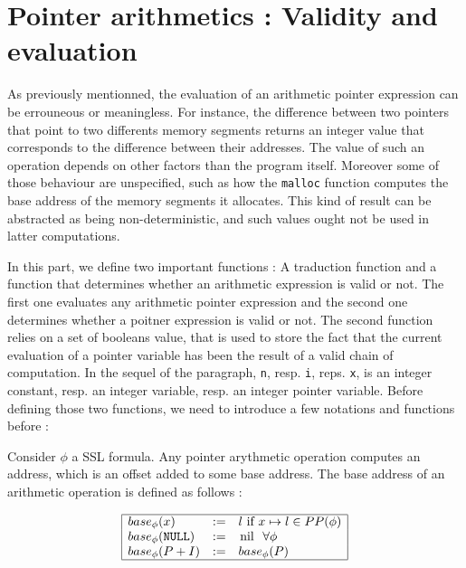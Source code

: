 \section{Pointer arithmetics : Validity and evaluation}

As previously mentionned, the evaluation of an arithmetic pointer
expression can be errouneous or meaningless. For instance, the difference
between two pointers that point to two differents memory segments returns an
integer value that corresponds to the difference between their addresses. The value of such an operation depends on other factors than the program itself. Moreover some of those behaviour are unspecified, such as how the \lstinline{malloc} function computes the base address of the memory segments it allocates. 
This kind of result can be abstracted  as being non-deterministic, and such 
values ought not be used in latter computations.

In this part, we define two important functions : A traduction function and a function that determines whether an arithmetic expression is valid or not.  
The first one evaluates any
arithmetic pointer expression and the second one determines whether
a poitner expression is valid or not.
The second function relies on a set of booleans value, that is used
to store the fact that the current evaluation of a pointer variable
has been the result of a valid chain of computation.
In the sequel of the paragraph, \lstinline!n!, resp. \lstinline!i!, reps. \lstinline!x!, is an integer constant, resp. an integer variable, resp. an integer
pointer variable.
Before defining those two functions, we need to introduce a few notations and
functions before :

Consider $\phi$ a SSL formula. Any pointer arythmetic operation computes
an address, which is an offset added to some base address. The base
address of an arithmetic operation is defined as follows :

$$
\begin{array}{|lll|}
\hline
\base{\phi}{x}&:=& l \mbox{ if }  \Pointsto{x}{l} \in \Pp{\phi} \\
\base{\phi}{\NULL} &:=& \nil \gspace \forall \phi \\
\base{\phi}{P+I} &:=& \base{\phi}{P} \\
\hline
\end{array}
$$

